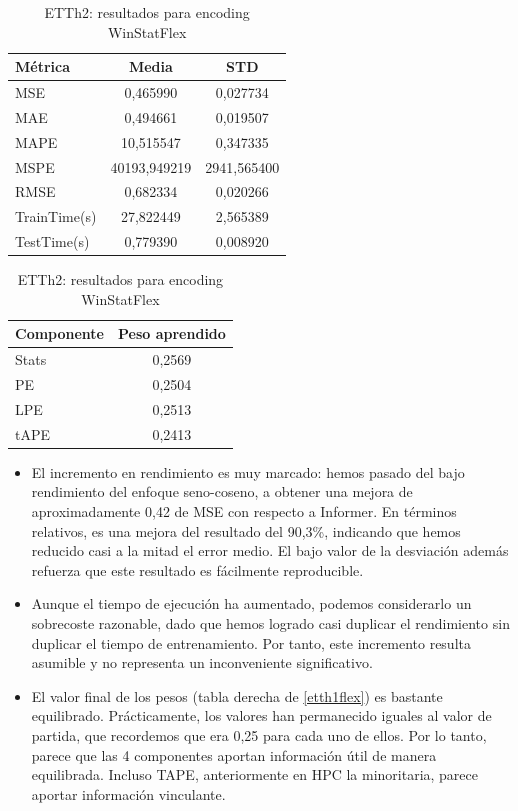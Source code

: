 \begin{table}[!ht]
	\centering
	\begin{minipage}{0.5\textwidth}
		\centering
			\begin{tabular}{l|c|c}
			\toprule
			Métrica & Media & STD \\
			\midrule
			MSE & 0,465990 & 0,027734 \\
			MAE & 0,494661 & 0,019507 \\
			MAPE & 10,515547 & 0,347335 \\
			MSPE & 40193,949219 & 2941,565400 \\
			RMSE & 0,682334 & 0,020266 \\
			TrainTime(s) & 27,822449 & 2,565389 \\
			TestTime(s) & 0,779390 & 0,008920 \\
			\bottomrule
		\end{tabular}
	\end{minipage}%
	\hfill
	\begin{minipage}{0.4\textwidth}
		\centering
		\begin{tabular}{l|c}
			\toprule
			Componente & Peso aprendido \\
			\midrule
			Stats & 0,2569 \\
			PE & 0,2504 \\
			LPE & 0,2513 \\
			tAPE & 0,2413 \\
			\bottomrule
		\end{tabular}
	\end{minipage}
	
	\caption{ETTh2: resultados para encoding WinStatFlex}
	\label{etth2flex}
\end{table}
 
 
 \begin{itemize}
 	\item El incremento en rendimiento es muy marcado: hemos pasado del bajo rendimiento del enfoque seno-coseno, a obtener una mejora de aproximadamente 0,42 de MSE con respecto a Informer. En términos relativos, es una mejora del resultado del 90,3\%, indicando que hemos reducido casi a la mitad el error medio. El bajo valor de la desviación además refuerza que este resultado es fácilmente reproducible.
 	
 	\item Aunque el tiempo de ejecución ha aumentado, podemos considerarlo un sobrecoste razonable, dado que hemos logrado casi duplicar el rendimiento sin duplicar el tiempo de entrenamiento. Por tanto, este incremento resulta asumible y no representa un inconveniente significativo.
 	
 	\item El valor final de los pesos (tabla derecha de \ref{etth1flex}) es bastante equilibrado. Prácticamente, los valores han permanecido iguales al valor de partida, que recordemos que era 0,25 para cada uno de ellos. Por lo tanto, parece que las 4 componentes aportan información útil de manera equilibrada. Incluso TAPE, anteriormente en HPC la minoritaria, parece aportar información vinculante.
 \end{itemize}
 
